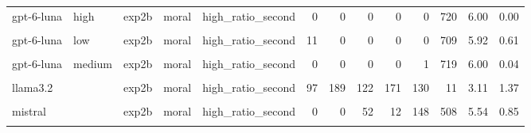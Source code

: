 \documentclass[
]{article}
\begin{document}
\begin{table}[!h]
{\begin{tabular}[t]{lllllrrrrrrrr}
gpt-6-luna & high & exp2b & moral & high\_ratio\_second & 0 & 0 & 0 & 0 & 0 & 720 & 6.00 & 0.00\\
\cellcolor{gray!10}{gpt-6-luna} & \cellcolor{gray!10}{low} & \cellcolor{gray!10}{exp2b} & \cellcolor{gray!10}{moral} & \cellcolor{gray!10}{high\_ratio\_first} & \cellcolor{gray!10}{23} & \cellcolor{gray!10}{0} & \cellcolor{gray!10}{2} & \cellcolor{gray!10}{0} & \cellcolor{gray!10}{6} & \cellcolor{gray!10}{689} & \cellcolor{gray!10}{5.82} & \cellcolor{gray!10}{0.90}\\
gpt-6-luna & low & exp2b & moral & high\_ratio\_second & 11 & 0 & 0 & 0 & 0 & 709 & 5.92 & 0.61\\
\addlinespace
\cellcolor{gray!10}{gpt-6-luna} & \cellcolor{gray!10}{medium} & \cellcolor{gray!10}{exp2b} & \cellcolor{gray!10}{moral} & \cellcolor{gray!10}{high\_ratio\_first} & \cellcolor{gray!10}{0} & \cellcolor{gray!10}{0} & \cellcolor{gray!10}{0} & \cellcolor{gray!10}{0} & \cellcolor{gray!10}{0} & \cellcolor{gray!10}{720} & \cellcolor{gray!10}{6.00} & \cellcolor{gray!10}{0.00}\\
gpt-6-luna & medium & exp2b & moral & high\_ratio\_second & 0 & 0 & 0 & 0 & 1 & 719 & 6.00 & 0.04\\
\cellcolor{gray!10}{llama3.2} & \cellcolor{gray!10}{} & \cellcolor{gray!10}{exp2b} & \cellcolor{gray!10}{moral} & \cellcolor{gray!10}{high\_ratio\_first} & \cellcolor{gray!10}{2} & \cellcolor{gray!10}{123} & \cellcolor{gray!10}{179} & \cellcolor{gray!10}{125} & \cellcolor{gray!10}{181} & \cellcolor{gray!10}{110} & \cellcolor{gray!10}{3.96} & \cellcolor{gray!10}{1.35}\\
llama3.2 &  & exp2b & moral & high\_ratio\_second & 97 & 189 & 122 & 171 & 130 & 11 & 3.11 & 1.37\\
\cellcolor{gray!10}{mistral} & \cellcolor{gray!10}{} & \cellcolor{gray!10}{exp2b} & \cellcolor{gray!10}{moral} & \cellcolor{gray!10}{high\_ratio\_first} & \cellcolor{gray!10}{234} & \cellcolor{gray!10}{270} & \cellcolor{gray!10}{87} & \cellcolor{gray!10}{91} & \cellcolor{gray!10}{9} & \cellcolor{gray!10}{29} & \cellcolor{gray!10}{2.25} & \cellcolor{gray!10}{1.28}\\
\addlinespace
mistral &  & exp2b & moral & high\_ratio\_second & 0 & 0 & 52 & 12 & 148 & 508 & 5.54 & 0.85\\
\cellcolor{gray!10}{mistral-medium-latest} & \cellcolor{gray!10}{} & \cellcolor{gray!10}{exp2b} & \cellcolor{gray!10}{moral} & \cellcolor{gray!10}{high\_ratio\_first} & \cellcolor{gray!10}{0} & \cellcolor{gray!10}{16} & \cellcolor{gray!10}{415} & \cellcolor{gray!10}{115} & \cellcolor{gray!10}{157} & \cellcolor{gray!10}{17} & \cellcolor{gray!10}{3.64} & \cellcolor{gray!10}{0.92}\\

\end{tabular}}
\end{table}
\end{document}
